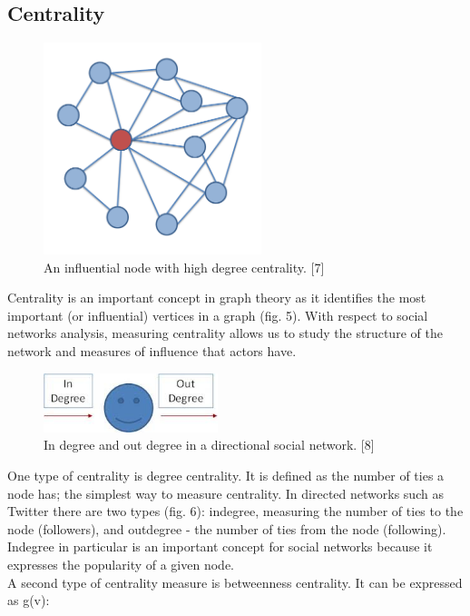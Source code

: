 \documentclass[conference,letterpaper]{IEEEtran}
\begin{document}
\subsection{Centrality}
\begin{center}
\begin{figure}[hb]
\centering
\includegraphics[width=2.5in]{ego_network}
\caption{
An influential node with high degree centrality. [7]
}
\label{fig_sim5}
\end{figure}
\end{center}
\indent
Centrality is an important concept in graph theory as it identifies the most important (or influential)
vertices in a graph (fig. 5). With respect to social networks analysis, measuring centrality allows us to
study the structure of the network and measures of influence that actors have.\\
\begin{center}
\begin{figure}[hb]
\centering
\includegraphics[width=2.0in]{degree_centrality}
\caption{
In degree and out degree in a directional social network. [8]
}
\label{fig_sim6}
\end{figure}
\end{center}
\indent
One type of centrality is degree centrality. It is defined as the number of ties a node has; the simplest
way to measure centrality. In directed networks such as Twitter there are two types (fig. 6): indegree,
measuring the number of ties to the node (followers), and outdegree - the number of ties from the node
(following). Indegree in particular is an important concept for social networks because it expresses
the popularity of a given node. \\
\indent
A second type of centrality measure is betweenness centrality. It can be expressed as g(v):
\end{document}

